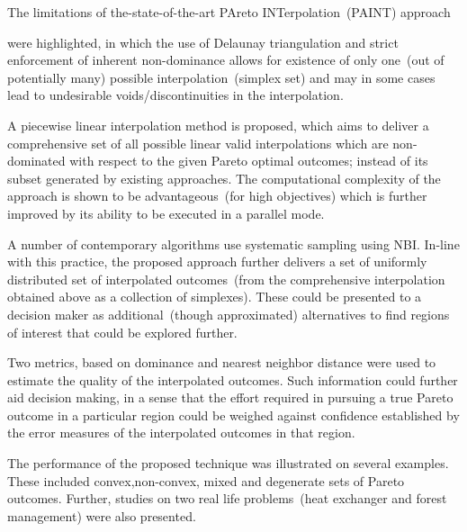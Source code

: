 \begin{enumerate}
	\item The limitations of the-state-of-the-art PAreto INTerpolation~(PAINT) approach {\color{blue}were highlighted, in which the use of Delaunay triangulation and strict enforcement of inherent non-dominance allows for existence of only one~(out of potentially many) possible interpolation~(simplex set) and may in some cases lead to undesirable voids/discontinuities in the interpolation. 
		\item A piecewise linear interpolation method is proposed, which aims to deliver a comprehensive set of all possible linear valid interpolations which are non-dominated with respect to the given Pareto optimal outcomes; instead of its subset generated by existing approaches. The computational complexity of the approach is shown to be advantageous~(for high objectives) which is further improved by its ability to be executed in a parallel mode. 
		\item A number of contemporary algorithms use systematic sampling using NBI. In-line with this practice, the proposed approach further delivers a set of uniformly distributed set of interpolated outcomes~(from the comprehensive interpolation obtained above as a collection of simplexes). These could be presented to a decision maker as additional~(though approximated) alternatives to find regions of interest that could be explored further.  
		\item Two metrics, based on dominance and nearest neighbor distance were used to estimate the quality of the interpolated outcomes. Such information could further aid decision making, in a sense that the effort required in pursuing a true Pareto outcome in a particular region could be weighed against confidence established by the error measures of the interpolated outcomes in that region.
		\item The performance of the proposed technique was illustrated on several examples. These included convex,non-convex, mixed and degenerate sets of Pareto outcomes. Further, studies on two real life problems~(heat exchanger and forest management) were also presented. 
	}
\end{enumerate}

